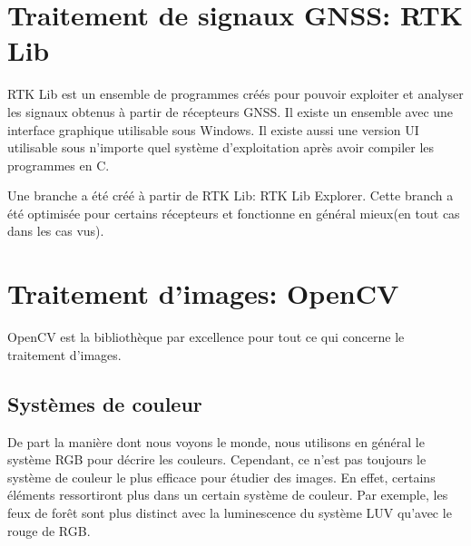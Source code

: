 \documentclass[a4paper, 11pt]{report}
\begin{document}
\chapter{Traitement de signaux GNSS: RTK Lib}

RTK Lib est un ensemble de programmes créés pour pouvoir exploiter et analyser les signaux obtenus à partir de récepteurs GNSS. Il existe un ensemble avec une interface graphique utilisable sous Windows. Il existe aussi une version UI utilisable sous n'importe quel système d'exploitation après avoir compiler les programmes en C.

Une branche a été créé à partir de RTK Lib: RTK Lib Explorer. Cette branch a été optimisée pour certains récepteurs et fonctionne en général mieux(en tout cas dans les cas vus).

\chapter{Traitement d'images: OpenCV}

OpenCV est la bibliothèque par excellence pour tout ce qui concerne le traitement d'images.

\section{Systèmes de couleur}
De part la manière dont nous voyons le monde, nous utilisons en général le système RGB pour décrire les couleurs. Cependant, ce n'est pas toujours le système de couleur le plus efficace pour étudier des images. En effet, certains éléments ressortiront plus dans un certain système de couleur. Par exemple, les feux de forêt sont plus distinct avec la luminescence du système LUV qu'avec le rouge de RGB.
\end{document}

